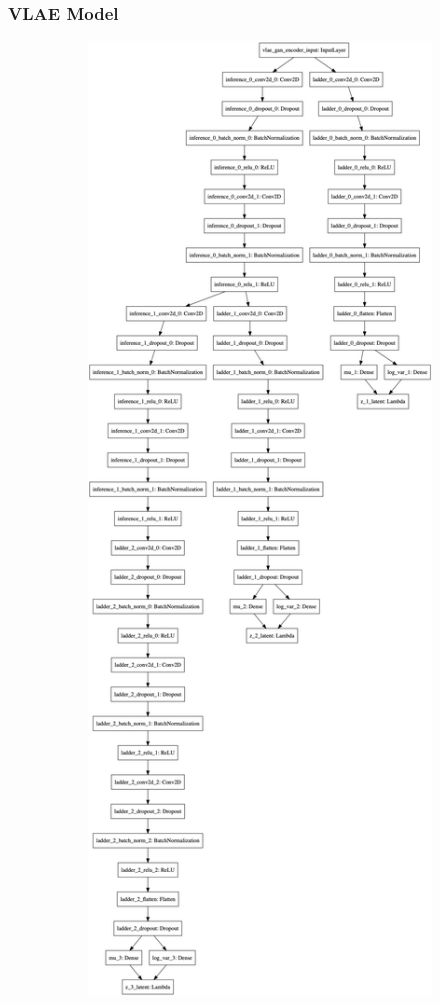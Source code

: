 \subsubsection{VLAE Model}

\begin{figure}
    \centering
    \begin{subfigure}{.5\textwidth}
        \centering
        \includegraphics[width=\textwidth,height=.85\textheight,keepaspectratio]{images/vlae/encoder.png}

\end{subfigure}
\end{figure}
